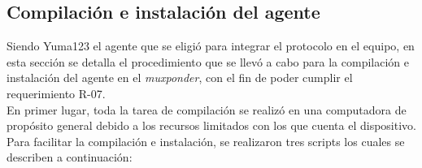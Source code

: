   \subsection{Compilación e instalación del agente}
Siendo Yuma123 el agente que se eligió para integrar el protocolo en el equipo, en esta sección se detalla el procedimiento que se llevó a cabo para la compilación e instalación del agente en el \textit{muxponder}, con el fin de poder cumplir el requerimiento R-07.
\\

  En primer lugar, toda la tarea de compilación se realizó en una computadora de propósito general debido a los recursos limitados con los que cuenta el dispositivo. Para facilitar la compilación e instalación, se realizaron tres scripts los cuales se describen a continuación:

